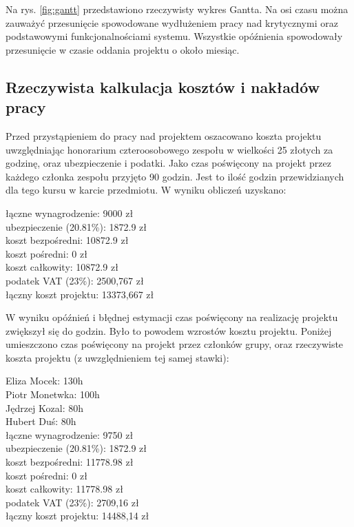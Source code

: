 \documentclass{article}
\newcommand\tab[1][1cm]{\hspace*{#1}}
\begin{document}
Na rys. \ref{fig:gantt} przedstawiono rzeczywisty wykres Gantta. Na osi czasu można zauważyć przesunięcie spowodowane wydłużeniem pracy nad krytycznymi oraz podstawowymi funkcjonalnościami systemu. Wszystkie opóźnienia spowodowały przesunięcie w czasie oddania projektu o około miesiąc.


\subsection{Rzeczywista kalkulacja kosztów i nakładów pracy}

Przed przystąpieniem do pracy nad projektem oszacowano koszta projektu uwzględniając honorarium czteroosobowego zespołu w wielkości 25 złotych za godzinę, oraz ubezpieczenie i podatki. Jako czas poświęcony na projekt przez każdego członka zespołu przyjęto 90 godzin. Jest to ilość godzin przewidzianych dla tego kursu w karcie przedmiotu. W wyniku obliczeń uzyskano:

\hspace*{0.35cm} łączne wynagrodzenie: 9000 zł \\
\tab ubezpieczenie (20.81\%): 1872.9 zł \\
\tab koszt bezpośredni: 10872.9 zł \\
\tab koszt pośredni: 0 zł \\
\tab koszt całkowity: 10872.9 zł \\
\tab podatek VAT (23\%): 2500,767 zł \\
\tab łączny koszt projektu: 13373,667 zł

W wyniku opóźnień i błędnej estymacji czas poświęcony na realizację projektu zwiększył się do  godzin. Było to powodem wzrostów kosztu projektu. Poniżej umieszczono czas poświęcony na projekt przez członków grupy, oraz rzeczywiste koszta projektu (z uwzględnieniem tej samej stawki):

\hspace*{0.35cm} Eliza Mocek: 130h \\
\tab Piotr Monetwka: 100h \\
\tab Jędrzej Kozal: 80h \\
\tab Hubert Duś: 80h \\

\hspace*{0.35cm} łączne wynagrodzenie: 9750 zł \\
\tab ubezpieczenie (20.81\%): 1872.9 zł \\
\tab koszt bezpośredni: 11778.98 zł \\
\tab koszt pośredni: 0 zł \\
\tab koszt całkowity: 11778.98 zł \\
\tab podatek VAT (23\%): 2709,16 zł \\
\tab łączny koszt projektu: 14488,14 zł
\end{document}

